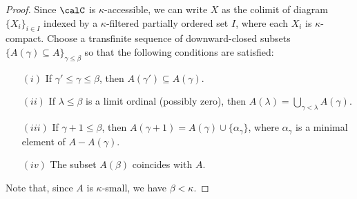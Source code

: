 \begin{CategoryTheory}
\begin{Didn't Read}
\begin{proof}
Since $\calC$ is $\kappa$-accessible, we can write $X$ as the colimit of 
diagram $\{ X_{i} \}_{i \in I}$ indexed by a $\kappa$-filtered partially ordered set $I$, where each $X_{i}$ is $\kappa$-compact. 
Choose a transfinite sequence of downward-closed subsets $\{ A(\gamma) \subseteq A \}_{\gamma \leq \beta}$ so that the following conditions are satisfied:
\begin{itemize}
\item[$(i)$] If $\gamma' \leq \gamma \leq \beta$, then $A(\gamma') \subseteq A(\gamma)$.
\item[$(ii)$] If $\lambda \leq \beta$ is a limit ordinal (possibly zero), then
$A(\lambda) = \bigcup_{ \gamma < \lambda} A(\gamma)$.
\item[$(iii)$] If $\gamma + 1 \leq \beta$, then $A(\gamma+1) = A(\gamma) \cup \{ \alpha_{\gamma} \}$, where $\alpha_{\gamma}$ is a minimal element of $A - A(\gamma)$.
\item[$(iv)$] The subset $A(\beta)$ coincides with $A$.
\end{itemize}
Note that, since $A$ is $\kappa$-small, we have $\beta < \kappa$.


\end{proof}
\end{Didn't Read}
\end{CategoryTheory}
